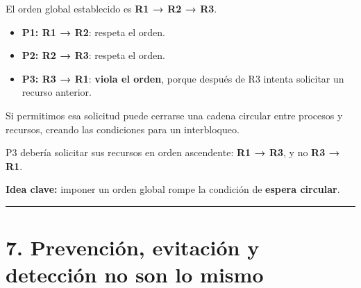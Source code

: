 \documentclass[
  spanish,
  letterpaper,
]{scrbook}
\providecommand{\tightlist}{%
  \setlength{\itemsep}{0pt}\setlength{\parskip}{0pt}}
\begin{document}
\begin{tcolorbox}[enhanced jigsaw, arc=.35mm, bottomrule=.15mm, bottomtitle=1mm, breakable, colback=white, colbacktitle=quarto-callout-tip-color!10!white, colframe=quarto-callout-tip-color-frame, coltitle=black, left=2mm, leftrule=.75mm, opacityback=0, opacitybacktitle=0.6, rightrule=.15mm, title=\textcolor{quarto-callout-tip-color}{\faLightbulb}\hspace{0.5em}{✅ Ver solución}, titlerule=0mm, toprule=.15mm, toptitle=1mm]

El orden global establecido es \textbf{R1 → R2 → R3}.

\begin{itemize}
\tightlist
\item
  \textbf{P1: R1 → R2}: respeta el orden.
\item
  \textbf{P2: R2 → R3}: respeta el orden.
\item
  \textbf{P3: R3 → R1}: \textbf{viola el orden}, porque después de R3
  intenta solicitar un recurso anterior.
\end{itemize}

Si permitimos esa solicitud puede cerrarse una cadena circular entre
procesos y recursos, creando las condiciones para un interbloqueo.

P3 debería solicitar sus recursos en orden ascendente: \textbf{R1 → R3},
y no \textbf{R3 → R1}.

\textbf{Idea clave:} imponer un orden global rompe la condición de
\textbf{espera circular}.

\end{tcolorbox}

\begin{center}\rule{0.5\linewidth}{0.5pt}\end{center}


\chapter{7. Prevención, evitación y detección no son lo
mismo}\label{prevenciuxf3n-evitaciuxf3n-y-detecciuxf3n-no-son-lo-mismo}
\end{document}
